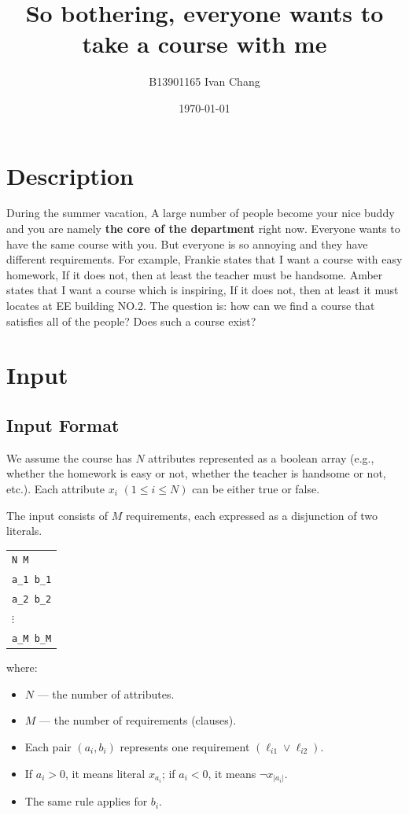 \documentclass[a4paper,12pt]{article}
\title{So bothering, everyone wants to take a course with me}
\author{B13901165 Ivan Chang}
\date{\today}
\begin{document}
\maketitle

\section{Description}
During the summer vacation, A large number of people become your nice buddy and you are namely \textbf{the core of the department}
right now. Everyone wants to have the same course with you. But everyone is so annoying and they have different requirements.
For example, Frankie states that I want a course with easy homework, If it does not, then at least the teacher must be handsome.
Amber states that I want a course which is inspiring, If it does not, then at least it must locates at EE building NO.2.
The question is: how can we find a course that satisfies all of the people? Does such a course exist?
\section{Input}
\subsection*{Input Format}

We assume the course has $N$ attributes represented as a boolean array 
(e.g., whether the homework is easy or not, whether the teacher is handsome or not, etc.).  
Each attribute $x_i$ $(1 \le i \le N)$ can be either true or false.

The input consists of $M$ requirements, each expressed as a disjunction of two literals.

\begin{center}
\begin{tabular}{l}
\texttt{N M} \\
\texttt{a\_1 b\_1} \\
\texttt{a\_2 b\_2} \\
$\vdots$ \\
\texttt{a\_M b\_M}
\end{tabular}
\end{center}

\noindent
where:
\begin{itemize}[leftmargin=1.5em]
    \item $N$ --- the number of attributes.
    \item $M$ --- the number of requirements (clauses).
    \item Each pair $(a_i, b_i)$ represents one requirement $(\ell_{i1} \lor \ell_{i2})$.
    \item If $a_i > 0$, it means literal $x_{a_i}$; if $a_i < 0$, it means $\lnot x_{|a_i|}$.
    \item The same rule applies for $b_i$.
\end{itemize}
\end{document}
